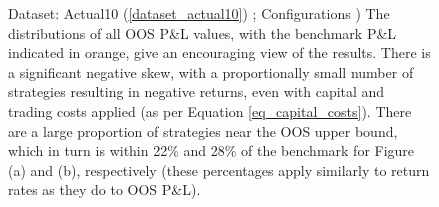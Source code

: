 \documentclass[a4paper,11pt,oneside]{article}
\theoremstyle{plain}
\theoremstyle{definition}
\begin{document}
\begin{figure}[H]
\begin{subfigure}{.5\textwidth}
		\end{subfigure}
		\caption[MMS OOS P\&L Distributions]{Dataset: Actual10 (\ref{dataset_actual10}) ; Configurations )
			\newline The distributions of all OOS P\&L values, with the benchmark P\&L indicated in orange, give an encouraging view of the results. There is a significant negative skew, with a proportionally small number of strategies resulting in negative returns, even with capital and trading costs applied (as per Equation \ref{eq_capital_costs}). There are a large proportion of strategies near the OOS upper bound, which in turn is within 22\% and 28\% of the benchmark for Figure (a) and (b), respectively (these percentages apply similarly to return rates as they do to OOS P\&L).
		}
		\label{results_pl_pdf_cost}
	\end{figure}
	
\end{document}

